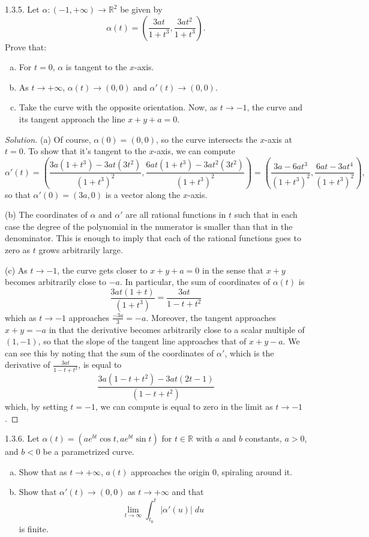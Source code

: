 \documentclass[11pt]{scrartcl}
\providecommand{\RR}{\mathbb R}
\providecommand{\ii}{\item}
\providecommand{\dif}{\;d}
\newenvironment{soln}{\begin{proof}[Solution]}{\end{proof}}
\begin{document}
\begin{problem*}1.3.5.
	Let $\alpha\colon(-1,+\infty)\to\RR^2$ be given by
	\[\alpha(t) = \left(\frac{3at}{1+t^3},\frac{3at^2}{1+t^3}\right).\]
	Prove that:
	\begin{enumerate}[(a)]
		\ii For $t = 0$, $\alpha$ is tangent to the $x$-axis.
		\ii As $t\to+\infty$, $\alpha(t)\to(0,0)$ and $\alpha'(t)\to(0,0)$.
		\ii Take the curve with the opposite orientation. Now, as $t\to-1$,
		the curve and its tangent approach the line $x+y+a=0$.
	\end{enumerate}
\end{problem*}

\begin{soln}
	(a) Of course, $\alpha(0) = (0,0)$, so the curve intersects
	the $x$-axis at $t=0$. To show that it's tangent to the $x$-axis,
	we can compute
	\[\alpha'(t) = \left(\frac{3a(1+t^3) - 3at(3t^2)}{(1+t^3)^2},
	\frac{6at(1+t^3) - 3at^2(3t^2)}{(1+t^3)^2}\right)
	= \left(\frac{3a-6at^3}{(1+t^3)^2},
	\frac{6at-3at^4}{(1+t^3)^2}\right),\]
	so that $\alpha'(0) = (3a,0)$ is a vector along the $x$-axis.
	
	(b) The coordinates of $\alpha$ and $\alpha'$ are all
	rational functions in $t$ such that in each case
	the degree of the polynomial in the numerator is smaller than
	that in the denominator. This is enough to imply that
	each of the rational functions goes to zero as $t$ grows
	arbitrarily large.
	
	(c) As $t\to-1$, the curve gets closer to $x+y+a=0$
	in the sense that $x+y$ becomes arbitrarily close to $-a$.
	In particular, the sum of coordinates of $\alpha(t)$ is
	\[\frac{3at(1+t)}{(1+t^3)} = \frac{3at}{1-t+t^2}\]
	which as $t\to-1$ approaches $\frac{-3a}{3} = -a$.
	Moreover, the tangent approaches $x+y=-a$ in that the derivative
	becomes arbitrarily close to a scalar multiple of $(1,-1)$,
	so that the slope of the tangent line approaches that of $x+y-a$.
	We can see this by noting that the sum of the coordinates of $\alpha'$,
	which is the derivative of $\frac{3at}{1-t+t^2}$, is equal to
	\[\frac{3a(1-t+t^2) - 3at(2t-1)}{(1-t+t^2)}\]
	which, by setting $t=-1$, we can compute is equal to zero
	in the limit as $t\to-1$.
\end{soln}

\begin{problem*}1.3.6.
	Let $\alpha(t) = (ae^{bt}\cos t,ae^{bt}\sin t)$ for $t\in\RR$
	with $a$ and $b$ constants, $a > 0$, and $b < 0$ be a parametrized curve.
	\begin{enumerate}[(a)]
		\ii Show that as $t\to +\infty$, $a(t)$ approaches the origin $0$,
		spiraling around it.
		\ii Show that $\alpha'(t)\to(0,0)$ as $t\to+\infty$ and that
		\[\lim_{t\to\infty} \int_{t_0}^t |\alpha'(u)|\dif u\]
		is finite.
	\end{enumerate}
\end{problem*}
\end{document}
